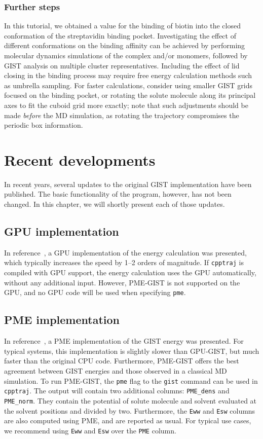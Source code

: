 \documentclass[9pt,tutorial,pubversion]{livecoms}
\newcommand{\software}{\texttt}
\newcommand\inlinecode{\texttt}
\begin{document}
\subsubsection{Further steps}
In this tutorial, we obtained a value for the binding of biotin into the closed conformation of the streptavidin binding pocket.
Investigating the effect of different conformations on the binding affinity can be achieved by performing molecular dynamics simulations of the complex and/or monomers, followed by GIST analysis on multiple cluster representatives.
Including the effect of lid closing in the binding process may require free energy calculation methods such as umbrella sampling.
For faster calculations, consider using smaller GIST grids focused on the binding pocket, or rotating the solute molecule along its principal axes to fit the cuboid grid more exactly; note that such adjustments should be made \emph{before} the MD simulation, as rotating the trajectory compromises the periodic box information.

\section{Recent developments}
In recent years, several updates to the original GIST implementation have been published.
The basic functionality of the program, however, has not been changed.
In this chapter, we will shortly present each of those updates.
\subsection{GPU implementation}
In reference~\cite{Kraml2020}, a GPU implementation of the energy calculation was presented, which typically increases the speed by 1--2 orders of magnitude.
If \software{cpptraj} is compiled with GPU support, the energy calculation uses the GPU automatically, without any additional input.
However, PME-GIST is not supported on the GPU, and no GPU code will be used when specifying \inlinecode{pme}.

\subsection{PME implementation}
In reference~\cite{Chen2021}, a PME implementation of the GIST energy was presented.
For typical systems, this implementation is slightly slower than GPU-GIST, but much faster than the original CPU code.
Furthermore, PME-GIST offers the best agreement between GIST energies and those observed in a classical MD simulation.
To run PME-GIST, the \inlinecode{pme} flag to the \inlinecode{gist} command can be used in \software{cpptraj}.
The output will contain two additional columns: \inlinecode{PME\_dens} and \inlinecode{PME\_norm}.
They contain the potential of solute molecule and solvent evaluated at the solvent positions and divided by two.
Furthermore, the \inlinecode{Eww} and \inlinecode{Esw} columns are also computed using PME, and are reported as usual.
For typical use cases, we recommend using \inlinecode{Eww} and \inlinecode{Esw} over the \inlinecode{PME} column.
\end{document}
